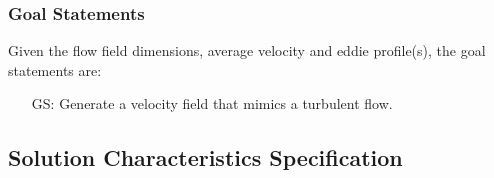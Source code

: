 \documentclass[12pt]{article}
\newcounter{goalnum} %
\begin{document}


\subsubsection{Goal Statements}


\noindent Given the flow field dimensions, average velocity and eddie profile(s), the goal statements are:

\begin{itemize}

\item[GS\refstepcounter{goalnum}\thegoalnum \label{G_anyFlowField}:] Generate a velocity field that mimics a turbulent flow.


\end{itemize}

\subsection{Solution Characteristics Specification} \label{sec_solSpec}
\end{document}
